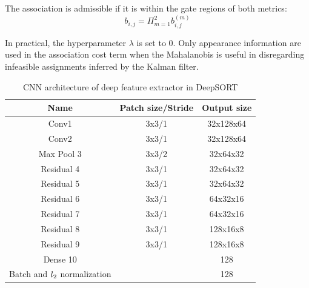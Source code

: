 The association is admissible if it is within the gate regions of both metrics:
\begin{equation}
    b_{i,j}=\Pi^2_{m=1}b^{(m)}_{i,j}
\end{equation}\par
In practical, the hyperparameter $\lambda$ is set to 0. Only appearance information are used in the association cost term when the Mahalanobis is useful in disregarding infeasible assignments inferred by the Kalman filter.
\begin{table}[H]
\begin{center}
 \begin{tabular}{||c c c ||} 
 \hline
 Name & Patch size/Stride & Output size \\ [0.5ex] 
 \hline\hline
 Conv1 & 3x3/1 & 32x128x64  \\ 
 Conv2 & 3x3/1 & 32x128x64 \\
 Max Pool 3 & 3x3/2 & 32x64x32 \\
 Residual 4 & 3x3/1 & 32x64x32 \\
 Residual 5 & 3x3/1 & 32x64x32 \\
 Residual 6 & 3x3/1 & 64x32x16 \\
 Residual 7 & 3x3/1 & 64x32x16 \\
 Residual 8 & 3x3/1 & 128x16x8 \\
 Residual 9 & 3x3/1 & 128x16x8 \\
 Dense 10   &       & 128    \\
 Batch and $\mathnormal{l}_2$ normalization &  & 128 \\
 \hline

 \hline
\end{tabular}
\end{center}
    \caption{CNN architecture of deep feature extractor in DeepSORT}
    \label{tab:cnn_deepsort_arch}
\end{table}\pagebreak
